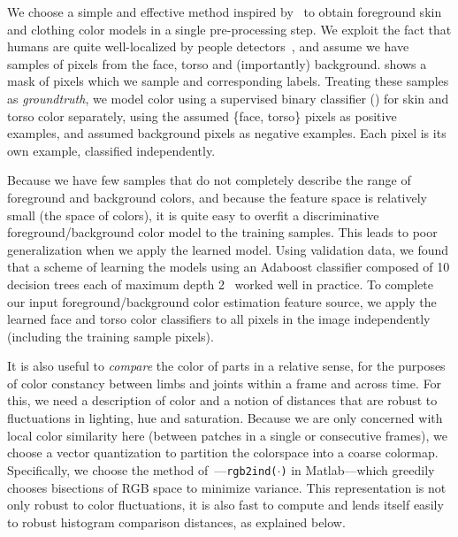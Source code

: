 We choose a simple and effective method inspired by~\citet{strikeapose} to 
obtain foreground skin and clothing color models in a single pre-processing 
step.  We exploit the fact that humans are quite well-localized by people 
detectors~\citep{ferrari08}, and assume we have samples of pixels from the 
face, torso and (importantly) background.   shows a mask of 
pixels which we sample and corresponding labels.  Treating these samples as 
{\em groundtruth}, we model color using a supervised binary classifier 
() for skin and torso color separately, using the assumed \{face, 
torso\} pixels as positive examples, and assumed background pixels as negative 
examples.  Each pixel is its own example, classified independently.

Because we have few samples that do not completely describe the range of 
foreground and background colors, and because the feature space is relatively 
small (the space of colors), it is quite easy to overfit a discriminative 
foreground/background color model to the training samples. This leads to poor 
generalization when we apply the learned model.  Using validation data, we 
found that a scheme of learning the models using an Adaboost classifier 
composed of 10 decision trees each of maximum depth 2~\citep{esl-book} worked 
well in practice.  To complete our input foreground/background color estimation 
feature source, we apply the learned face and torso color classifiers to all 
pixels in the image independently (including the training sample pixels).

It is also useful to {\em compare } the color of parts in a relative sense, for 
the purposes of color constancy between limbs and joints within a frame and 
across time.  For this, we need a description of color and a notion of 
distances that are robust to fluctuations in lighting, hue and saturation.  
Because we are only concerned with local color similarity here (between patches 
in a single or consecutive frames), we choose a vector quantization to 
partition the colorspace into a coarse colormap.  Specifically, we choose the 
method of~\citet{heckbert1982color}---\texttt{rgb2ind($\cdot$)} in {\sc Matlab}---which 
greedily chooses bisections of RGB space to minimize variance.  This 
representation is not only robust to color fluctuations, it is also fast to 
compute and lends itself easily to robust histogram comparison distances, as 
explained below.

